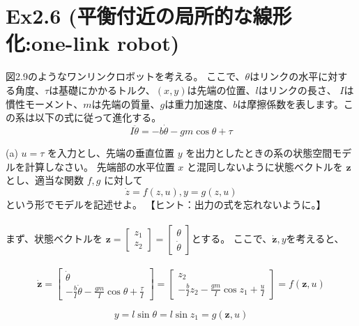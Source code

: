 \documentclass{jsarticle}
\begin{document}

\section*{Ex2.6 (平衡付近の局所的な線形化:one-link robot)} 

図2.9のようなワンリンクロボットを考える。
ここで、$\theta$はリンクの水平に対する角度、$\tau$は基礎にかかるトルク、$(x,y)$は先端の位置、$l$はリンクの長さ、
$I$は慣性モーメント、$m$は先端の質量、$g$は重力加速度、$b$は摩擦係数を表します。この系は以下の式に従って進化する。
\begin{equation}
  I\ddot{\theta} = -b\dot{\theta} - gm\cos{\theta} + \tau
\end{equation}

(a) $u = \tau$ を入力とし、先端の垂直位置 $y$ を出力としたときの系の状態空間モデルを計算しなさい。
先端部の水平位置 $x$ と混同しないように状態ベクトルを $\bm{z}$ とし、適当な関数 $f, g$ に対して
\begin{equation}
  \dot{z} = f(z,u),y = g(z,u)
\end{equation}
という形でモデルを記述せよ。
【ヒント：出力の式を忘れないように。】
\;\\
\;\\
まず、状態ベクトルを
$\bm{z} = \left[ \begin{array}{c} z_1\\z_2 \end{array} \right] = \left[ \begin{array}{c} \theta\\ \dot{\theta} \end{array}\right]$とする。
ここで、$\dot{\bm{z}},y$を考えると、
\;\\
\;\\
\begin{equation}
  \dot{\bm{z}} = \left[
    \begin{array}{c}
      \dot{\theta}\\
      -\frac{b}{I}\dot{\theta}-\frac{gm}{I}\cos{\theta}+\frac{\tau}{I}
    \end{array}
  \right]
  = \left[
    \begin{array}{c}
      z_2\\
      -\frac{b}{I}z_2-\frac{gm}{I}\cos{z_1}+\frac{u}{I}
    \end{array}
  \right]
  = f(\bm{z},u)
\end{equation}

\begin{equation}
  y = l\sin{\theta} = l\sin{z_1} = g(\bm{z},u)
\end{equation}
\end{document}
